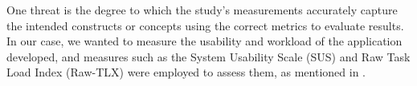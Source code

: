 One threat is the degree to which the study's measurements accurately capture
the intended constructs or concepts using the correct metrics to evaluate
results. In our case, we wanted to measure the usability and workload of the
application developed, and measures such as the System Usability Scale (SUS)
and Raw Task Load Index (Raw-TLX) were employed to assess them, as mentioned in
.
